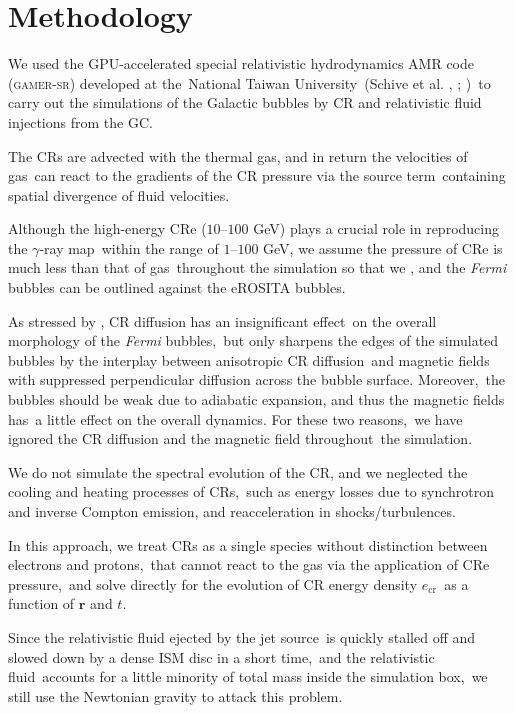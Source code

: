 \documentclass[twocolumn]{aastex631}
\begin{document}
\section{Methodology}
\label{Methodology}
  We used the GPU-accelerated special relativistic hydrodynamics AMR code (\textsc{gamer-sr}) developed at the\
  National Taiwan University\
  (Schive et al. \citeyear{gamer-1}, \citeyear{gamer-2}; \citeauthor{tseng2021} \citeyear{tseng2021})\
  to carry out the simulations of the Galactic bubbles by CR and relativistic fluid injections from the GC.

  The CRs are advected with the thermal gas, and in return the velocities of gas\
  can react to the gradients of the CR pressure via the source term\
  containing spatial divergence of fluid velocities.\

  Although the high-energy CRe ($10$--$100$ GeV) plays a crucial role in reproducing the $\gamma$-ray map\
  within the range of $1$--$100$ GeV, we assume the pressure of CRe is much less than that of gas\
  throughout the simulation so that we , and the \textit{Fermi} bubbles can be outlined against the eROSITA bubbles.

  As stressed by \citet{Yang2012}, CR diffusion has an insignificant effect\
  on the overall morphology of the \textit{Fermi} bubbles,\
  but only sharpens the edges of the simulated bubbles by the interplay between anisotropic CR diffusion\
  and magnetic fields with suppressed perpendicular diffusion across the bubble surface. Moreover,\
  the bubbles should be weak due to adiabatic expansion, and thus the magnetic fields has\
  a little effect on the overall dynamics. For these two reasons,\
  we have ignored the CR diffusion and the magnetic field throughout\
  the simulation.

  We do not simulate the spectral evolution of the CR, and we neglected the cooling and heating processes of CRs,\
  such as energy losses due to synchrotron and inverse Compton emission, and reacceleration in shocks/turbulences.\

  In this approach, we treat CRs as a single species without distinction between electrons and protons,\
  that cannot react to the gas via the application of CRe pressure,\
  and solve directly for the evolution of CR energy density $e_{\text{cr}}$\
  as a function of $\mathbf{r}$ and $t$.\

  Since the relativistic fluid ejected by the jet source\
  is quickly stalled off and slowed down by a dense ISM disc in a short time,\
  and the relativistic fluid\
  accounts for a little minority of total mass inside the simulation box,\
  we still use the Newtonian gravity to attack this problem.
\end{document}
